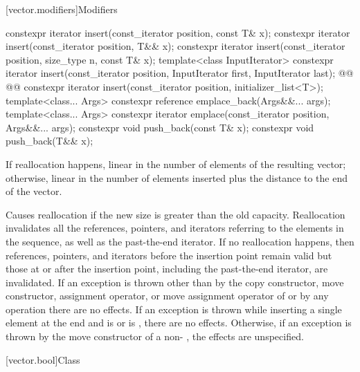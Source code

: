 \documentclass{wg21}
\begin{document}
[vector.modifiers]{Modifiers}

%
\begin{itemdecl}
    constexpr iterator insert(const_iterator position, const T& x);
    constexpr iterator insert(const_iterator position, T&& x);
    constexpr iterator insert(const_iterator position, size_type n, const T& x);
    template<class InputIterator>
    constexpr iterator insert(const_iterator position, InputIterator first, InputIterator last);
    @@
    @@
    constexpr iterator insert(const_iterator position, initializer_list<T>);
    template<class... Args> constexpr reference emplace_back(Args&&... args);
    template<class... Args> constexpr iterator emplace(const_iterator position, Args&&... args);
    constexpr void push_back(const T& x);
    constexpr void push_back(T&& x);
\end{itemdecl}

\begin{itemdescr}
    \pnum
    \complexity
    If reallocation happens,
    linear in the number of elements of the resulting vector;
    otherwise,
    linear in the number of elements inserted plus the distance
    to the end of the vector.
    
    \pnum
    \remarks
    Causes reallocation if the new size is greater than the old capacity.
    Reallocation invalidates all the references, pointers, and iterators
    referring to the elements in the sequence, as well as the past-the-end iterator.
    If no reallocation happens, then
    references, pointers, and iterators
    before the insertion point remain valid
    but those at or after the insertion point,
    including the past-the-end iterator,
    are invalidated.
    If an exception is thrown other than by
    the copy constructor, move constructor,
    assignment operator, or move assignment operator of
     or by any  operation
    there are no effects.
    If an exception is thrown while inserting a single element at the end and
     is  or 
    is , there are no effects.
    Otherwise, if an exception is thrown by the move constructor of a non-
    , the effects are unspecified.
\end{itemdescr}

[vector.bool]{Class }
\end{document}
